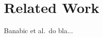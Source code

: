 \section{Related Work}\label{sec:rel_work}

Banabic et al.~do bla... 
\cite{trojan14}




\iffalse
§8	Related Work
		> Was haben andere mit S2E in ähnlicher Richtung gemacht?
		> Z.B. "Finding Trojan Message Vulnerabilities in Distributed Systems”
\fi